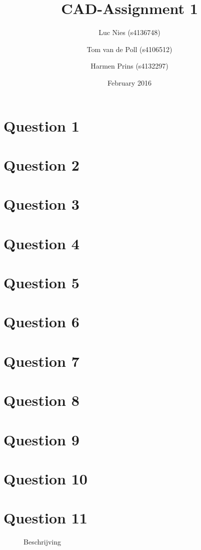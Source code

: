 \documentclass{article}
\title{CAD-Assignment 1}
\author{Luc Nies (s4136748) \and Tom van de Poll (s4106512) \and Harmen Prins (s4132297)}
\date{February 2016}
\begin{document}
\maketitle

\section*{Question 1}

\section*{Question 2}

\section*{Question 3}

\section*{Question 4}
\section*{Question 5}
\section*{Question 6}
\section*{Question 7}
\section*{Question 8}
\section*{Question 9}
\section*{Question 10}
\section*{Question 11}



\begin{figure}[h]
    \centering
    \caption{Beschrijving}
\end{figure}

\begin{lstlisting}
\end{lstlisting}
\end{document}
